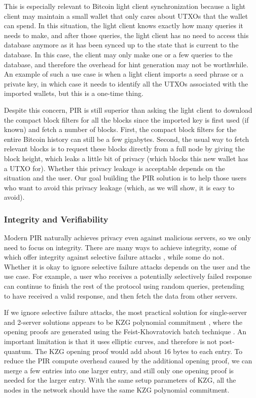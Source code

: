 This is especially relevant to Bitcoin light client synchronization because a light client may maintain a small wallet that only cares about UTXOs that the wallet can spend. In this situation, the light client knows exactly how many queries it needs to make, and after those queries, the light client has no need to access this database anymore as it has been synced up to the state that is current to the database. In this case, the client may only make one or a few queries to the database, and therefore the overhead for hint generation may not be worthwhile. An example of such a use case is when a light client imports a seed phrase or a private key, in which case it needs to identify all the UTXOs associated with the imported wallets, but this is a one-time thing.

Despite this concern, PIR is still superior than asking the light client to download the compact block filters for all the blocks since the imported key is first used (if known) and fetch a  number of blocks. First, the compact block filters for the entire Bitcoin history can still be a few gigabytes. Second, the usual way to fetch relevant blocks is to request these blocks directly from a full node by giving the block height, which leaks a little bit of privacy (which blocks this new wallet has a UTXO for). Whether this privacy leakage is acceptable depends on the situation and the user. Our goal building the PIR solution is to help those users who want to avoid this privacy leakage (which, as we will show, it is easy to avoid).

\subsubsection{Integrity and Verifiability}

Modern PIR naturally achieves privacy even against malicious servers, so we only need to focus on integrity. There are many ways to achieve integrity, some of which offer integrity against selective failure attacks \cite{kilian88,naor99,dwork99,camenisch07,lindell11,kiraz06}, while some do not. Whether it is okay to ignore selective failure attacks depends on the user and the use case. For example, a user who receives a potentially selectively failed response can continue to finish the rest of the protocol using random queries, pretending to have received a valid response, and then fetch the data from other servers.

If we ignore selective failure attacks, the most practical solution for single-server and 2-server solutions appears to be KZG polynomial commitment \cite{kzg10}, where the opening proofs are generated using the Feist-Khovratovich batch technique \cite{fk23}. An important limitation is that it uses elliptic curves, and therefore is not post-quantum. The KZG opening proof would add about 16 bytes to each entry. To reduce the PIR compute overhead caused by the additional opening proof, we can merge a few entries into one larger entry, and still only one opening proof is needed for the larger entry. With the same setup parameters of KZG, all the nodes in the network should have the same KZG polynomial commitment.

